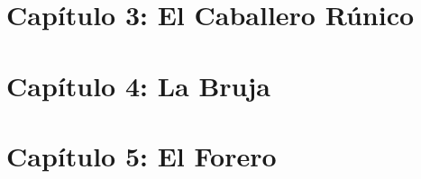 \documentclass[
  letterpaper,
]{book}
\begin{document}

\hypertarget{capuxedtulo-3-el-caballero-ruxfanico}{%
\chapter{Capítulo 3: El Caballero
Rúnico}\label{capuxedtulo-3-el-caballero-ruxfanico}}


\hypertarget{capuxedtulo-4-la-bruja}{%
\chapter{Capítulo 4: La Bruja}\label{capuxedtulo-4-la-bruja}}


\hypertarget{capuxedtulo-5-el-forero}{%
\chapter{Capítulo 5: El Forero}\label{capuxedtulo-5-el-forero}}


\backmatter
\end{document}
